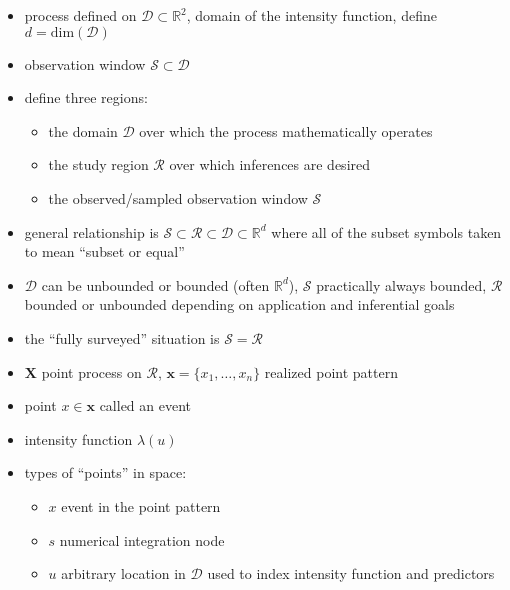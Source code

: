 \documentclass[review]{elsarticle}
\begin{document}
\begin{itemize}

\item process defined on \(\mathcal{D} \subset \mathbb{R}^{2}\), domain of the
intensity function, define \(d = \mathrm{dim}(\mathcal{D})\)

\item observation window \(\mathcal{S} \subset \mathcal{D}\)

\item define three regions:
\begin{itemize}
\item the domain \(\mathcal{D}\) over which the process mathematically operates
\item the study region \(\mathcal{R}\) over which inferences are desired
\item the observed/sampled observation window \(\mathcal{S}\)
\end{itemize}

\item general relationship is \(\mathcal{S} \subset \mathcal{R}
\subset \mathcal{D} \subset \mathbb{R}^{d}\) where all of the subset symbols
taken to mean ``subset or equal''

\item \(\mathcal{D}\) can be unbounded or bounded (often \(\mathbb{R}^{d}\)),
$\mathcal{S}$ practically always bounded, \(\mathcal{R}\) bounded or unbounded
depending on application and inferential goals

\item the ``fully surveyed'' situation is \(\mathcal{S} = \mathcal{R}\)

\item \(\mathbf{X}\) point process on \(\mathcal{R}\), \(\mathbf{x} = \{x_{1},
\dots, x_{n}\}\) realized point pattern

\item point \(x \in \mathbf{x}\) called an event

\item intensity function \(\lambda(u)\)

\item types of ``points'' in space:
\begin{itemize}
\item \(x\) event in the point pattern
\item \(s\) numerical integration node
\item \(u\) arbitrary location in \(\mathcal{D}\) used to index intensity
function and predictors
\end{itemize}


\end{itemize}
\end{document}

